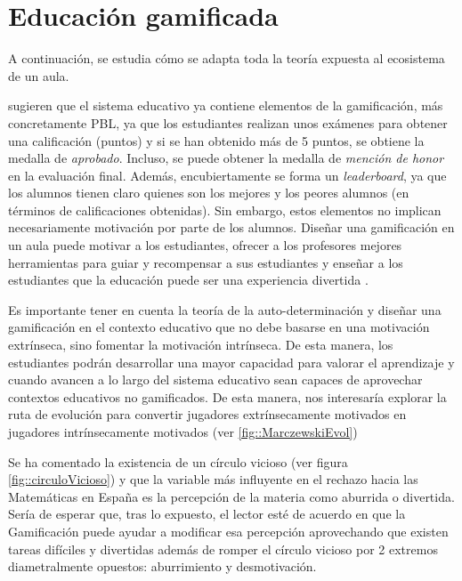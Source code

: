 

\chapter{Educación gamificada}

A continuación, se estudia cómo se adapta toda la teoría expuesta al ecosistema de un aula.


\cite{lee2011gamification} sugieren que el sistema educativo ya contiene elementos de la gamificación, más concretamente \gls{PBL}, ya que los estudiantes realizan unos exámenes para obtener una calificación (puntos) y si se han obtenido más de 5 puntos, se obtiene la medalla de \textit{aprobado}.
%
Incluso, se puede obtener la medalla de \textit{mención de honor} en la evaluación final.
%
Además, encubiertamente se forma un \textit{leaderboard}, ya que los alumnos tienen claro quienes son los mejores y los peores alumnos (en términos de calificaciones obtenidas).
%
Sin embargo, estos elementos no implican necesariamente motivación por parte de los alumnos.
%
Diseñar una gamificación en un aula puede motivar a los estudiantes, ofrecer a los profesores mejores herramientas para guiar y recompensar a sus estudiantes y enseñar a los estudiantes que la educación puede ser una experiencia divertida  \citep{lee2011gamification}.

Es importante tener en cuenta la teoría de la auto-determinación  y diseñar una gamificación en el contexto educativo que no debe basarse en una motivación extrínseca, sino fomentar la motivación intrínseca. 
%
De esta manera, los estudiantes podrán desarrollar una mayor capacidad para valorar el aprendizaje y cuando avancen a lo largo del sistema educativo sean capaces de aprovechar contextos educativos no gamificados. 
%
De esta manera, nos interesaría explorar la ruta de evolución \citep{marczewski}  para convertir jugadores extrínsecamente motivados en jugadores intrínsecamente motivados (ver \ref{fig::MarczewskiEvol})


Se ha comentado la existencia de un círculo vicioso (ver figura \ref{fig::circuloVicioso}) y que la variable más influyente en el rechazo hacia las Matemáticas en España es la percepción de la materia como aburrida o divertida.
%
Sería de esperar que, tras lo expuesto, el lector esté de acuerdo en que la Gamificación puede ayudar a modificar esa percepción aprovechando que existen tareas difíciles y divertidas  además de romper el círculo vicioso por 2 extremos diametralmente opuestos: aburrimiento y desmotivación.

